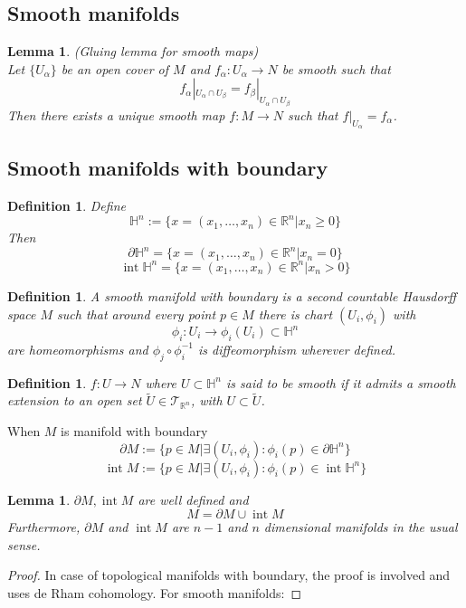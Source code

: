 \documentclass{article}
\numberwithin{theorem}{section}
\newtheorem{lemma}[theorem]{Lemma}
\newtheorem{definition}[theorem]{Definition}
\newcommand{\R}{\mathbb{R}}
\newcommand{\1}{\mathds{1}}
\newcommand{\Hp}{\mathbb{H}}
\DeclareMathOperator{\topint}{int}
\begin{document}
\subsection{Smooth manifolds}

\begin{lemma}(Gluing lemma for smooth maps)\\
    Let $\{ U_\alpha \} $ be an open cover of $M$ and $f_\alpha : U_\alpha \to N$ be smooth such that 
    \[ f_\alpha |_{U_\alpha \cap U_\beta} = f_\beta|_{U_\alpha \cap U_\beta} \]
    Then there exists a unique smooth map $f: M \to N$ such that $f|_{U_\alpha} = f_\alpha$. 
    
\end{lemma}

\subsection{Smooth manifolds with boundary}
\begin{definition}
    Define 
    \[ \Hp^n := \{ x = (x_1, \dots, x_n) \in \R^n | x_n \geq 0 \} \]
    Then 
    \[ \partial \Hp^n = \{ x = (x_1, \dots, x_n) \in \R^n | x_n = 0 \} \]
    \[ \topint \Hp^n = \{ x = (x_1, \dots, x_n) \in \R^n | x_n > 0 \} \]
\end{definition}

\begin{definition}
    A smooth manifold with boundary is a second countable Hausdorff space $M$ such that around every point $p \in M$ there is chart $(U_i, \phi_i)$ with 
    \[ \phi_i : U_i \to \phi_i(U_i) \subset \Hp^n \]
    are homeomorphisms and $\phi_j \circ \phi_i^{-1} $ is diffeomorphism wherever defined. 
\end{definition}
\begin{definition}
    $f : U \to N$ where $U \subset \Hp^n$ is said to be smooth if it admits a smooth extension to an open set $\tilde{U} \in \mathcal{T}_{\R^n}$, with $U \subset \tilde{U}$. 
\end{definition}

When $M$ is manifold with boundary 
\[ \partial M := \{ p \in M| \exists (U_i, \phi_i) : \phi_i(p) \in \partial \Hp^n \} \]
\[ \topint M := \{ p \in M| \exists (U_i, \phi_i) : \phi_i(p) \in \topint \Hp^n \} \]

\begin{lemma}
    $\partial M, \topint M$ are well defined and 
    \[ M = \partial M \cup \topint M \]
    Furthermore, $\partial M$ and $\topint M$ are $n-1 $ and $n$ dimensional manifolds in the usual sense. 
\end{lemma}
\begin{proof}
    In case of topological manifolds with boundary, the proof is involved and uses de Rham cohomology. For smooth manifolds: 
\end{proof}
\end{document}
